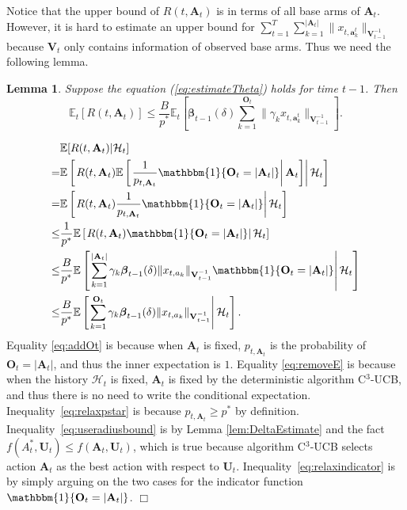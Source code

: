 \documentclass{article}
\newcommand{\bbeta}{\boldsymbol{\beta}}
\newcommand{\EE}{\mathbb{E}}
\newcommand{\bOne}{\mathbbm{1}}
\newcommand{\bA}{\mathbf{A}}
\newcommand{\ba}{\mathbf{a}}
\newcommand{\bO}{\mathbf{O}}
\newcommand{\bU}{\mathbf{U}}
\newcommand{\bV}{\mathbf{V}}
\newcommand{\cH}{\mathcal{H}}
\newcommand{\abs}[1]{\left| #1 \right|}
\newcommand{\norm}[1]{\| #1 \|}
\newtheorem{lemma}[theorem]{Lemma}%
\newenvironment{proof}{\noindent {\textbf{Proof. }}}{$\Box$ \medskip}
\begin{document}
Notice that the upper bound of $R(t, \bA_t)$ is in terms of all base arms of $\bA_t$. However, it is hard to estimate an upper bound for $\sum_{t=1}^T \sum_{k=1}^{\abs{\bA_t}} \norm{ x_{t, \ba_k^t} }_{ \bV_{t-1}^{-1} }$ because $\bV_t$ only contains information of observed base arms. Thus we need the following lemma.

\begin{lemma} %
	\label{lem:DeltaEsimateWithP*}
	Suppose the equation (\ref{eq:estimateTheta}) holds for time $t-1$. Then
	$$
	\EE_t[R(t, \bA_t)] \leq \frac{B}{p^*} \EE_t \left[ \bbeta_{t-1}(\delta) \sum_{k=1}^{\bO_t}\norm{\gamma_k x_{t,\ba_k^t}}_{\bV_{t-1}^{-1}} \right].
	$$
\end{lemma}
\begin{proof}
	\begin{align}
		&\EE[R(t, \bA_t)|\cH_t]  \nonumber \\
		=& \EE \left[ \left. R(t, \bA_t) \EE \left[ \left. \frac{1}{p_{t, \bA_t}} \bOne\{\bO_t = \abs{\bA_t}\} \right| \bA_t \right]  \right| \cH_t \right] \label{eq:addOt}\\
		=& \EE \left[ \left. R(t, \bA_t) \frac{1}{p_{t, \bA_t}} \bOne\{\bO_t = \abs{\bA_t}\}  \right| \cH_t \right] \label{eq:removeE}\\
		\leq &\frac{1}{p^{\ast}} \EE \left[ \left. R(t, \bA_t) \bOne\{\bO_t = \abs{\bA_t}\}  \right| \cH_t \right] \label{eq:relaxpstar}\\
		\leq &\frac{B}{p^{\ast}} \EE \left[ \left. \sum_{k=1}^{\abs{\bA_t}} \gamma_k \bbeta_{t-1}(\delta)\norm{x_{t,a_k}}_{\bV_{t-1}^{-1}} \bOne\{\bO_t = \abs{\bA_t}\}  \right| \cH_t \right] \label{eq:useradiusbound}\\
		\leq &\frac{B}{p^{\ast}} \EE \left[ \left. \sum_{k=1}^{\bO_t} \gamma_k \bbeta_{t-1}(\delta)\norm{x_{t,a_k}}_{\bV_{t-1}^{-1}} \right| \cH_t \right]. \label{eq:relaxindicator}
	\end{align}
	Equality \eqref{eq:addOt} is because when $\bA_t$ is fixed, $p_{t, \bA_t}$ is the probability of $\bO_t = \abs{\bA_t}$, and thus the inner expectation is $1$. Equality \eqref{eq:removeE} is because when the history $\cH_t$ is fixed, $\bA_t$ is fixed by the deterministic algorithm C$^3$-UCB, and thus there is no need to write the conditional expectation. Inequality~\eqref{eq:relaxpstar} is because $p_{t,\bA_t} \geq p^*$ by definition. Inequality~\eqref{eq:useradiusbound} is by Lemma \ref{lem:DeltaEstimate} and the fact $f(A_t^*, \bU_t) \leq f(\bA_t, \bU_t)$, which is true because algorithm C$^3$-UCB selects action $\bA_t$ as the best action with respect to $\bU_t$. Inequality~\eqref{eq:relaxindicator} is by simply arguing on the two cases for the indicator function $\bOne\{\bO_t = \abs{\bA_t}\}$.
\end{proof}
\end{document}
